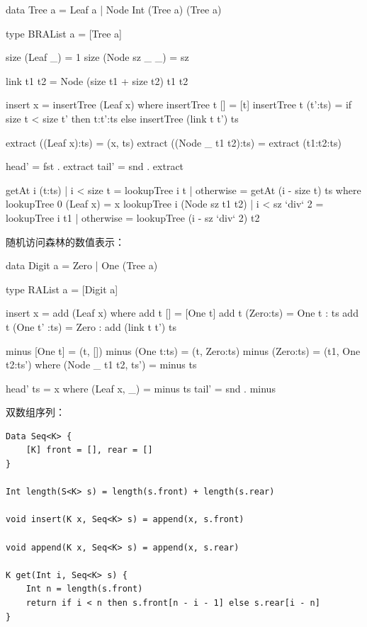 \documentclass[b5paper]{ctexart}
\begin{document}
\lstset{frame = single}
\begin{Haskell}
data Tree a = Leaf a
            | Node Int (Tree a) (Tree a)

type BRAList a = [Tree a]

size (Leaf _) = 1
size (Node sz _ _) = sz

link t1 t2 = Node (size t1 + size t2) t1 t2

insert x = insertTree (Leaf x) where
    insertTree t [] = [t]
    insertTree t (t':ts) = if size t < size t' then  t:t':ts
                           else insertTree (link t t') ts

extract ((Leaf x):ts) = (x, ts)
extract ((Node _ t1 t2):ts) = extract (t1:t2:ts)

head' = fst . extract
tail' = snd . extract

getAt i (t:ts) | i < size t = lookupTree i t
               | otherwise = getAt (i - size t) ts
  where
    lookupTree 0 (Leaf x) = x
    lookupTree i (Node sz t1 t2)
        | i < sz `div` 2 = lookupTree i t1
        | otherwise = lookupTree (i - sz `div` 2) t2
\end{Haskell}

随机访问森林的数值表示：
\begin{Haskell}
data Digit a = Zero | One (Tree a)

type RAList a = [Digit a]

insert x = add (Leaf x) where
  add t [] = [One t]
  add t (Zero:ts) = One t : ts
  add t (One t' :ts) = Zero : add (link t t') ts

minus [One t] = (t, [])
minus (One t:ts) = (t, Zero:ts)
minus (Zero:ts) = (t1, One t2:ts') where
    (Node _ t1 t2, ts') = minus ts

head' ts = x where (Leaf x, _) = minus ts
tail' = snd . minus
\end{Haskell}

双数组序列：

\begin{lstlisting}[language = Bourbaki]
Data Seq<K> {
    [K] front = [], rear = []
}

Int length(S<K> s) = length(s.front) + length(s.rear)

void insert(K x, Seq<K> s) = append(x, s.front)

void append(K x, Seq<K> s) = append(x, s.rear)

K get(Int i, Seq<K> s) {
    Int n = length(s.front)
    return if i < n then s.front[n - i - 1] else s.rear[i - n]
}
\end{lstlisting}
\end{document}
